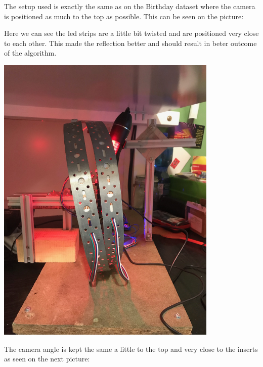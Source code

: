 The setup used is exactly the same as on the Birthday dataset where the camera is positioned as much to the top as possible. This can be seen on the picture:

Here we can see the led strips are a little bit twisted and are positioned very close to each other. This made the reflection better and should result in beter outcome of the algorithm.



\includegraphics[width=4.166667in, keepaspectratio=true]{./fig/Vision/Dataset/automated_datasets/2_created_datasets/2_Spaghetti_dataset/IMG_9295.jpeg}



The camera angle is kept the same a little to the top and very close to the inserts as seen on the next picture:

